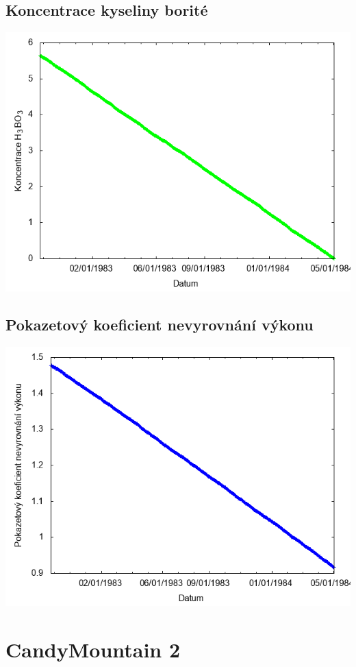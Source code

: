\documentclass[a4paper,twoside,11pt]{article}
\begin{document}
\subsection*{Koncentrace kyseliny borité}
\begin{center}
\includegraphics[width=.8\textwidth]{graphs/CandyMountain_01_bc.png}
\end{center}

\subsection*{Pokazetový koeficient nevyrovnání výkonu}
\begin{center}
\includegraphics[width=.8\textwidth]{graphs/CandyMountain_01_fha.png}
\end{center}

\newpage
\section*{CandyMountain 2}
\end{document}
